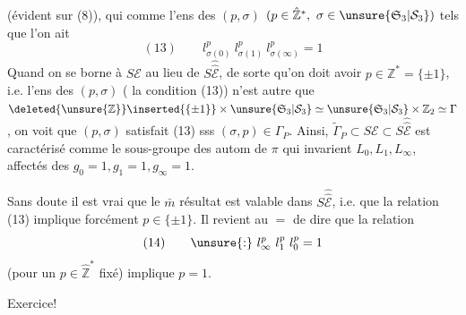(évident sur (8)), qui  comme l'ens des $(p,\sigma)$ $(p\in\hat{\mathbb Z}^*,\ \sigma\in\unsure{\mathfrak S_3|\mathcal S_3})$ tels que l'on ait
\[
(13)\qquad l_{\sigma(0)}^p\ l_{\sigma(1)}^p\ l_{\sigma(\infty)}^p=1
\]
Quand on se borne à $S\mathcal E$ au lieu de $S\widehat{\widehat{\mathcal E}}$, de sorte qu'on doit avoir $p\in\mathbb Z^*=\{\pm1\}$,  i.e. l'ens des $(p,\sigma)$ ( la condition (13)) n'est autre que $\deleted{\unsure{\mathbb Z}}\inserted{\{\pm1\}}\times\unsure{\mathfrak S_3|\mathcal S_3}\simeq\unsure{\mathfrak S_3|\mathcal S_3}\times\mathbb Z_2\simeq\Gamma$, on voit que $(p,\sigma)$ satisfait (13) sss $(\sigma,p)\in\Gamma_P$. Ainsi, $\tilde\Gamma_P\subset S\mathcal E\subset S\widehat{\widehat{\mathcal E}}$ est caractérisé comme le sous-groupe  des autom de $\pi$  qui invarient $L_0,L_1,L_\infty$, affectés des  $g_0=1,g_1=1,g_\infty=1$.

Sans doute il est vrai que le $\bar m$ résultat est valable dans $S\widehat{\widehat{\mathcal E}}$, i.e. que la relation (13) implique forcément $p\in\{\pm1\}$. Il revient au $=$ de dire  que la relation
\[
(14)\qquad \unsure{:}\ l_\infty^p\ l_1^p\ l_0^p=1
\]
(pour un $p\in\hat{\mathbb Z}^*$ fixé) implique $p=1$.

Exercice!
